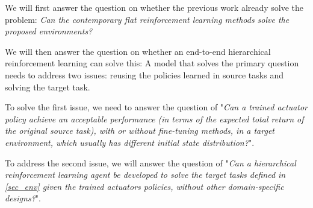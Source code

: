 We will first answer the question on whether the previous work already solve the problem: \textit{Can the contemporary flat reinforcement learning methods solve the proposed environments?}


We will then answer the question on whether an end-to-end hierarchical reinforcement learning can solve this:
A model that solves the primary question needs to address two issues: reusing the policies learned in source tasks and solving the target task.

To solve the first issue, we need to answer the question of "\textit{Can a trained actuator policy achieve an acceptable performance (in terms of the expected total return of the original source task), with or without fine-tuning methods, in a target environment, which usually has different initial state distribution?}".

To address the second issue, we will answer the question of "\textit{Can a hierarchical reinforcement learning agent be developed to solve the target tasks defined in \ref{sec_env} given the trained actuators policies, without other domain-specific designs?}".

